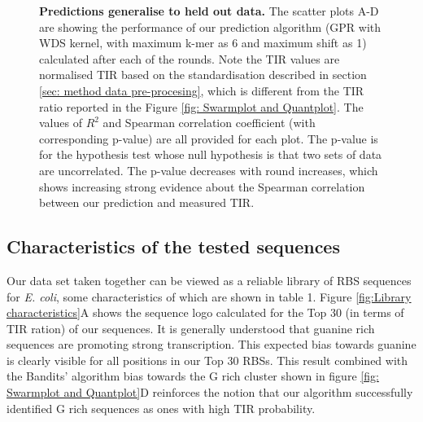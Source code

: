 \documentclass{article}
\begin{document}
\begin{figure}[!ht]
\begin{subfigure}[b]{0.49\textwidth}
    \end{subfigure}
    \caption{\textbf{Predictions generalise to held out data.} The scatter plots A-D are showing the performance of our prediction algorithm (GPR with WDS kernel, with maximum k-mer as 6 and maximum shift as 1) calculated after each of the rounds.
    Note the TIR values are normalised TIR based on the standardisation described in section \ref{sec: method data pre-procesing}, which is different from the TIR ratio reported in the Figure \ref{fig: Swarmplot and Quantplot}.
    The values of 
    $R^2$ and Spearman correlation coefficient (with corresponding p-value) are all provided for each plot.
    The p-value is for the hypothesis test whose null hypothesis is that two sets of data are uncorrelated.
    The p-value decreases with round increases, which shows increasing strong evidence about the Spearman correlation between our prediction and measured TIR. 
    }
    \label{fig: Scatterplot}
\end{figure}

\subsection{Characteristics of the tested sequences}

Our data set taken together can be viewed as a reliable library of RBS sequences for \emph{E. coli}, some characteristics of which are shown in table 1.
Figure \ref{fig:Library characteristics}A shows the sequence logo calculated for the Top 30 (in terms of TIR ration) of our sequences.
It is generally understood that guanine rich sequences are promoting strong transcription.
This expected bias towards guanine is clearly visible for all positions in our Top 30 RBSs.
This result combined with the Bandits' algorithm bias towards the G rich cluster shown in figure \ref{fig: Swarmplot and Quantplot}D reinforces the notion that our algorithm successfully identified G rich sequences as ones with high TIR probability.
\end{document}
